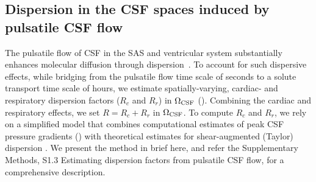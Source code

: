 \documentclass[fleqn,10pt]{wlscirep}
\begin{document}



\subsection*{Dispersion in the CSF spaces induced by pulsatile CSF flow}

The pulsatile flow of CSF in the SAS and ventricular system
substantially enhances molecular diffusion through
dispersion~\cite{taylor1953dispersion, watson1983diffusion,
  asgari2016glymphatic, sharp2019dispersion, ray2021quantitative,
  troyetsky2021dispersion}. To account for such dispersive effects,
while bridging from the pulsatile flow time scale of seconds to a
solute transport time scale of hours, we estimate spatially-varying,
cardiac- and respiratory dispersion factors ($R_c$ and $R_r$) in
$\Omega_{\rm CSF}$ (). Combining the cardiac and
respiratory effects, we set $R = R_c + R_r$ in $\Omega_{\rm CSF}$. To
compute $R_c$ and $R_r$, we rely on a simplified model that combines
computational estimates of peak CSF pressure gradients
() with theoretical estimates for shear-augmented
(Taylor) dispersion \cite{taylor1953dispersion, watson1983diffusion,
  sharp2019dispersion}. We present the method in brief here, and refer
the Supplementary Methods, S1.3 Estimating dispersion factors from
pulsatile CSF flow, for a comprehensive description.
\end{document}
